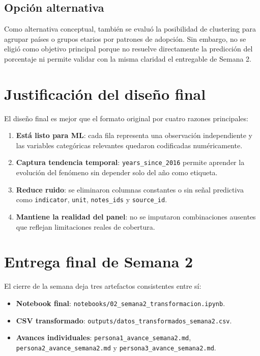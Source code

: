 \documentclass[12pt,a4paper]{article}
\begin{document}
\subsection{Opción alternativa}

Como alternativa conceptual, también se evaluó la posibilidad de clustering para agrupar países o grupos etarios por patrones de adopción. Sin embargo, no se eligió como objetivo principal porque no resuelve directamente la predicción del porcentaje ni permite validar con la misma claridad el entregable de Semana 2.

\section{Justificación del diseño final}

El diseño final es mejor que el formato original por cuatro razones principales:

\begin{enumerate}
    \item \textbf{Está listo para ML}: cada fila representa una observación independiente y las variables categóricas relevantes quedaron codificadas numéricamente.
    \item \textbf{Captura tendencia temporal}: \texttt{years\_since\_2016} permite aprender la evolución del fenómeno sin depender solo del año como etiqueta.
    \item \textbf{Reduce ruido}: se eliminaron columnas constantes o sin señal predictiva como \texttt{indicator}, \texttt{unit}, \texttt{notes\_ids} y \texttt{source\_id}.
    \item \textbf{Mantiene la realidad del panel}: no se imputaron combinaciones ausentes que reflejan limitaciones reales de cobertura.
\end{enumerate}

\section{Entrega final de Semana 2}

El cierre de la semana deja tres artefactos consistentes entre sí:

\begin{itemize}
    \item \textbf{Notebook final}: \texttt{notebooks/02\_semana2\_transformacion.ipynb}.
    \item \textbf{CSV transformado}: \texttt{outputs/datos\_transformados\_semana2.csv}.
    \item \textbf{Avances individuales}: \texttt{persona1\_avance\_semana2.md}, \texttt{persona2\_avance\_semana2.md} y \texttt{persona3\_avance\_semana2.md}.
\end{itemize}
\end{document}
